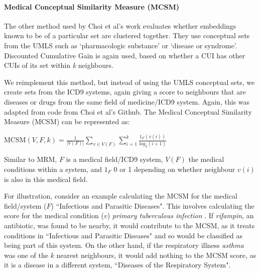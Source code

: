 \documentclass[11pt,a4paper]{article}
\begin{document}
\paragraph{Medical Conceptual Similarity Measure (MCSM)} The other method used by Choi et al's work evaluates whether embeddings known to be of a particular set are clustered together. They use conceptual sets from the UMLS such as `pharmacologic substance' or `disease or syndrome'.  Discounted Cumulative Gain is again used, based on whether a CUI has other CUIs of its set within \emph{k} neighbours. 

We reimplement this method, but instead of using the UMLS conceptual sets, we create sets from the ICD9 systems, again giving a score to neighbours that are diseases or drugs from the same field of medicine/ICD9 system. Again, this was adapted from code from Choi et al's Github. The Medical Conceptual Similarity Measure (MCSM) can be represented as:

MCSM$(V,F,k) = \frac{1}{|V(F)|}\sum\limits_{v\in V(F)}\sum\limits_{i=1}^k \frac{1_F(v(i))}{log_2(i+1)}$

Similar to MRM, $F$ is a medical field/ICD9 system, $V(F)$ the medical conditions within a system, and $1_F$ 0 or 1 depending on whether neighbour $v(i)$ is also in this medical field.

For illustration, consider an example calculating the MCSM for the medical field/system ($F$) ``Infectious and Parasitic Diseases". This involves calculating the score for the medical condition ($v$) \emph{primary tuberculous infection} . If \emph{rifampin}, an antibiotic, was found to be nearby, it would contribute to the MCSM, as it treats conditions in ``Infectious and Parasitic Diseases" and so would be classified as being part of this system. On the other hand, if the respiratory illness \emph{asthma} was one of the $k$ nearest neighbours, it would add nothing to the MCSM score, as it is a disease in a different system, ``Diseases of the Respiratory System". 

%
\end{document}
